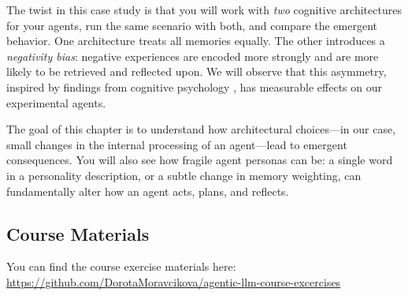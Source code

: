 The twist in this case study is that you will work with \emph{two} cognitive architectures for your agents, run the same scenario with both, and compare the emergent behavior. One architecture treats all memories equally. The other introduces a \emph{negativity bias}: negative experiences are encoded more strongly and are more likely to be retrieved and reflected upon. We will observe that this asymmetry, inspired by findings from cognitive psychology \citep{baumeister2001bad}, has measurable effects on our experimental agents.


The goal of this chapter is to understand how architectural choices---in our case, small changes in the internal processing of an agent---lead to emergent consequences. You will also see how fragile agent personas can be: a single word in a personality description, or a subtle change in memory weighting, can fundamentally alter how an agent acts, plans, and reflects.

\subsection*{Course Materials}
You can find the course exercise materials here: \\
\url{https://github.com/DorotaMoravcikova/agentic-llm-course-excercises}

